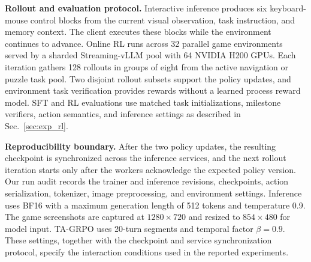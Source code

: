 \textbf{Rollout and evaluation protocol.}
Interactive inference produces six keyboard-mouse control blocks from the current visual observation, task instruction, and memory context. The client executes these blocks while the environment continues to advance. Online RL runs across 32 parallel game environments served by a sharded Streaming-vLLM pool with 64 NVIDIA H200 GPUs. Each iteration gathers 128 rollouts in groups of eight from the active navigation or puzzle task pool. Two disjoint rollout subsets support the policy updates, and environment task verification provides rewards without a learned process reward model. SFT and RL evaluations use matched task initializations, milestone verifiers, action semantics, and inference settings as described in Sec.~\ref{sec:exp_rl}.

\textbf{Reproducibility boundary.}
After the two policy updates, the resulting checkpoint is synchronized across the inference services, and the next rollout iteration starts only after the workers acknowledge the expected policy version. Our run audit records the trainer and inference revisions, checkpoints, action serialization, tokenizer, image preprocessing, and environment settings. Inference uses BF16 with a maximum generation length of 512 tokens and temperature 0.9. The game screenshots are captured at $1280\times720$ and resized to $854\times480$ for model input. TA-GRPO uses 20-turn segments and temporal factor $\beta=0.9$. These settings, together with the checkpoint and service synchronization protocol, specify the interaction conditions used in the reported experiments.





